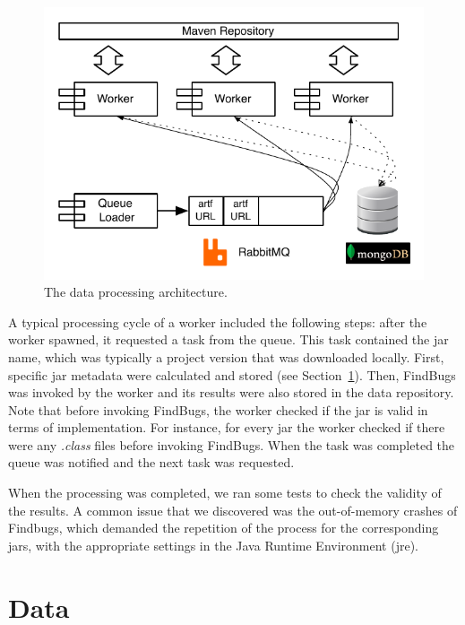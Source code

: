 \documentclass{sig-alternate}
\begin{document}
\begin{figure}[t]
  \begin{center}
    \includegraphics[scale=0.73]{figures/arch.pdf}
  \end{center}
  \caption{The data processing architecture.}
  \label{fig:arch}
\end{figure}

A typical processing cycle of a worker included the
following steps: after the worker spawned, it requested a task
from the queue. This task contained the {\sc jar} name, which
was typically a project version that was downloaded locally.
First, specific {\sc jar} metadata were calculated and stored
(see Section~\ref{sec:data}).
Then, FindBugs was invoked
by the worker and its results were also stored in the data
repository.
Note that before invoking FindBugs,
the worker checked if the {\sc jar} is valid in terms of implementation.
For instance, for every {\sc jar} the worker checked
if there were any {\it .class} files before invoking FindBugs.
When the task was completed
the queue was notified and the next task was requested.

When the processing was completed, we ran some tests
to check the validity of the results.
A common issue that we discovered was the out-of-memory
crashes of Findbugs, which demanded the repetition of the process
for the corresponding {\sc jar}s, with the appropriate
settings in the Java Runtime Environment ({\sc jre}).

\section{Data}
\label{sec:data}
\end{document}
